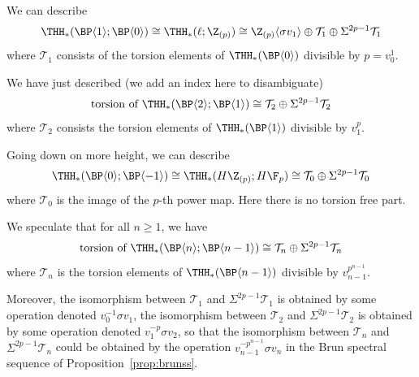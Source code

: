 \begin{remark}
  We can describe
  \[
    \THH_*(\BP \langle 1 \rangle; \BP \langle 0 \rangle) \cong \THH_*(\ell; \Z_{(p)}) \cong \Z_{(p)}\langle \sigma v_1 \rangle \oplus \mathcal{T}_1 \oplus \Sigma^{2p - 1} \mathcal{T}_1
  \]
  where $\mathcal{T}_1$ consists of the torsion elements of $\THH_*(\BP \langle 0 \rangle)$ divisible by $p = v_0^1$.

  We have just described (we add an index here to disambiguate)
  \[
    \text{torsion of } \THH_*(\BP \langle 2 \rangle; \BP \langle 1 \rangle)\cong  \mathcal{T}_2 \oplus \Sigma^{2p - 1} \mathcal{T}_2
  \]
  where $\mathcal{T}_2$ consists the torsion elements of $\THH_*(\BP \langle 1 \rangle)$ divisible by $v_1^p$.

  Going down on more height, we can describe
  \[
    \THH_*(\BP \langle 0 \rangle; \BP \langle -1 \rangle) \cong \THH_*(H \Z_{(p)}; H\F_p) \cong \mathcal{T}_0 \oplus \Sigma^{2p - 1} \mathcal{T}_0
  \]
  where $\mathcal{T}_0$ is the image of the $p$-th power map. Here there is no torsion free part. 
  
  We speculate that for all $n \geq 1$, we have
  \[
    \text{torsion of } \THH_*(\BP \langle n \rangle; \BP \langle n-1 \rangle) \cong  \mathcal{T}_n \oplus \Sigma^{2p - 1} \mathcal{T}_n
  \]
  where $\mathcal{T}_n$ is the torsion elements of $\THH_*(\BP \langle n-1 \rangle)$ divisible by $v_{n-1}^{p^{n-1}}$.


  
  Moreover, the isomorphism between $\mathcal{T}_1$ and $\Sigma^{2p-1} \mathcal{T}_1$ is obtained by some operation  denoted $v_0^{-1} \sigma v_1$, the isomorphism between $\mathcal{T}_2$ and $\Sigma^{2p-1} \mathcal{T}_2$ is obtained by some operation denoted $v_1^{-p} \sigma v_2$, so that the isomorphism between $\mathcal{T}_n$ and $\Sigma^{2p-1} \mathcal{T}_n$ could be obtained by the operation $v_{n-1}^{-p^{n-1}} \sigma v_n$ in the Brun spectral sequence of Proposition~\ref{prop:brunss}.
\end{remark}


